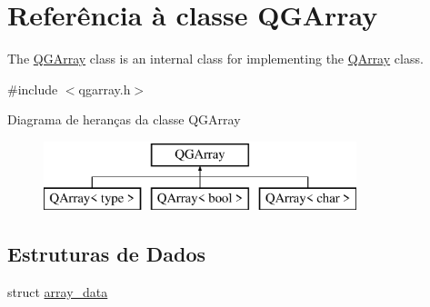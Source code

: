 \hypertarget{class_q_g_array}{\section{Referência à classe Q\-G\-Array}
\label{class_q_g_array}
}


The \hyperlink{class_q_g_array}{Q\-G\-Array} class is an internal class for implementing the \hyperlink{class_q_array}{Q\-Array} class.  




{\ttfamily \#include $<$qgarray.\-h$>$}

Diagrama de heranças da classe Q\-G\-Array\begin{figure}[H]
\begin{center}
\leavevmode
\includegraphics[height=2.000000cm]{class_q_g_array}
\end{center}
\end{figure}
\subsection*{Estruturas de Dados}
\begin{DoxyCompactItemize}
\item 
struct \hyperlink{struct_q_g_array_1_1array__data}{array\-\_\-data}
\end{DoxyCompactItemize}
